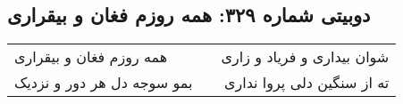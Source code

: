 \begin{center}
\section*{دوبیتی شماره ۳۲۹: همه روزم فغان و بیقراری}
\label{sec:329}
\begin{longtable}{l p{0.5cm} r}
همه روزم فغان و بیقراری
&&
شوان بیداری و فریاد و زاری
\\
بمو سوجه دل هر دور و نزدیک
&&
ته از سنگین دلی پروا نداری
\\
\end{longtable}
\end{center}
